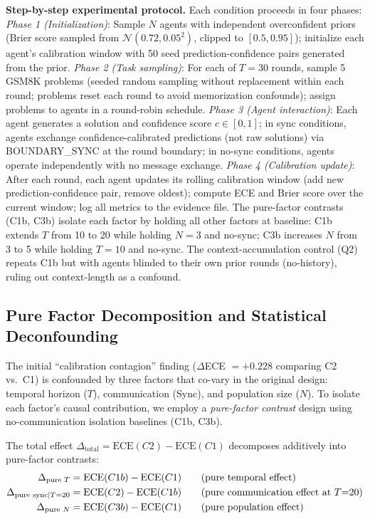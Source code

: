 \documentclass[11pt]{article}
\newcommand{\ECE}{\ensuremath{\mathrm{ECE}}}
\theoremstyle{definition}
\theoremstyle{remark}
\begin{document}
\textbf{Step-by-step experimental protocol.} Each condition proceeds in four phases: \textit{Phase 1 (Initialization)}: Sample $N$ agents with independent overconfident priors (Brier score sampled from $\mathcal{N}(0.72, 0.05^2)$, clipped to $[0.5, 0.95]$); initialize each agent's calibration window with 50 seed prediction-confidence pairs generated from the prior. \textit{Phase 2 (Task sampling)}: For each of $T{=}30$ rounds, sample 5 GSM8K problems (seeded random sampling without replacement within each round; problems reset each round to avoid memorization confounds); assign problems to agents in a round-robin schedule. \textit{Phase 3 (Agent interaction)}: Each agent generates a solution and confidence score $c \in [0,1]$; in sync conditions, agents exchange confidence-calibrated predictions (not raw solutions) via BOUNDARY\_SYNC at the round boundary; in no-sync conditions, agents operate independently with no message exchange. \textit{Phase 4 (Calibration update)}: After each round, each agent updates its rolling calibration window (add new prediction-confidence pair, remove oldest); compute ECE and Brier score over the current window; log all metrics to the evidence file. The pure-factor contrasts (C1b, C3b) isolate each factor by holding all other factors at baseline: C1b extends $T$ from 10 to 20 while holding $N{=}3$ and no-sync; C3b increases $N$ from 3 to 5 while holding $T{=}10$ and no-sync. The context-accumulation control (Q2) repeats C1b but with agents blinded to their own prior rounds (no-history), ruling out context-length as a confound.

\subsection{Pure Factor Decomposition and Statistical Deconfounding}

The initial ``calibration contagion'' finding ($\Delta$ECE $= +0.228$ comparing C2 vs.~C1) is confounded by three factors that co-vary in the original design: temporal horizon ($T$), communication (Sync), and population size ($N$). To isolate each factor's causal contribution, we employ a \textit{pure-factor contrast} design using no-communication isolation baselines (C1b, C3b).

The total effect $\Delta_{\text{total}} = \ECE(C2) - \ECE(C1)$ decomposes additively into pure-factor contrasts:
\begin{align}
    \Delta_{\text{pure } T} &= \ECE(C1b) - \ECE(C1) \tag{pure temporal effect} \\
    \Delta_{\text{pure sync}|T=20} &= \ECE(C2) - \ECE(C1b) \tag{pure communication effect at $T{=}20$} \\
    \Delta_{\text{pure } N} &= \ECE(C3b) - \ECE(C1) \tag{pure population effect}
\end{align}
\end{document}

